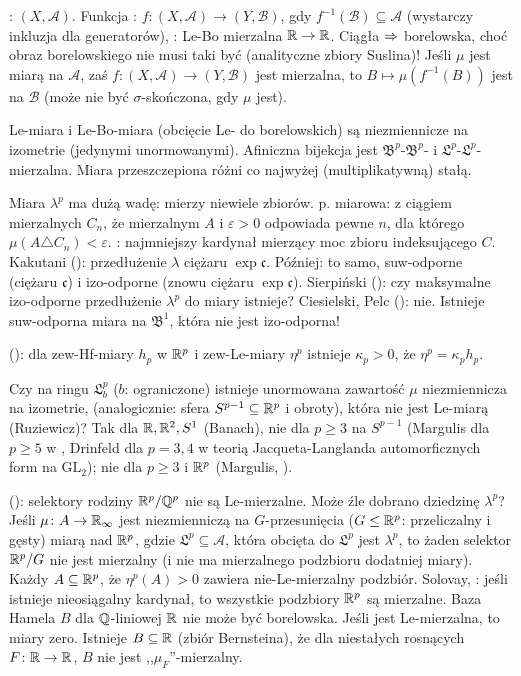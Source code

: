 :  $(X, \mathcal A)$.
Funkcja : $f \colon (X, \mathcal A) \to (Y, \mathcal B)$, gdy $f^{-1}(\mathcal B) \subseteq \mathcal A$ (wystarczy inkluzja dla generatorów), : Le-Bo mierzalna $\mathbb{R} \to \mathbb{R}$.
Ciągła $\Rightarrow$ borelowska, choć obraz borelowskiego nie musi taki być (analityczne zbiory Suslina)!
Jeśli $\mu$ jest miarą na $\mathcal A$, zaś $f \colon (X, \mathcal A) \to (Y, \mathcal B)$ jest mierzalna, to $B \mapsto \mu (f^{-1}(B))$ jest  na $\mathcal B$ (może nie być $\sigma$-skończona, gdy $\mu$ jest).

Le-miara  i Le-Bo-miara (obcięcie Le- do borelowskich) są niezmiennicze na izometrie (jedynymi unormowanymi).
Afiniczna bijekcja jest $\mathfrak B^p$-$\mathfrak B^p$- i $\mathfrak L^p$-$\mathfrak L^p$-mierzalna.
Miara przeszczepiona różni co najwyżej (multiplikatywną) stałą.

Miara $\lambda^p$ ma dużą wadę: mierzy niewiele zbiorów.
 p. miarowa: z ciągiem mierzalnych $C_n$, że mierzalnym $A$ i $\varepsilon > 0 $ odpowiada pewne $n$, dla którego $\mu(A \triangle C_n) < \varepsilon$.
: najmniejszy kardynał mierzący moc zbioru indeksującego $C$.
Kakutani (): przedłużenie $\lambda$ ciężaru $\exp \mathfrak c$.
Później: to samo, suw-odporne (ciężaru $\mathfrak c$) i izo-odporne (znowu ciężaru $\exp \mathfrak c$).
Sierpiński (): czy maksymalne izo-odporne przedłużenie $\lambda^p$ do miary istnieje?
Ciesielski, Pelc (): nie.
Istnieje suw-odporna miara na $\mathfrak B^1$, która nie jest izo-odporna!

 (): dla zew-Hf-miary $h_p$ w $\mathbb{R}^p$ i zew-Le-miary $\eta^p$ istnieje $\kappa_p > 0$, że $\eta^p = \kappa_p h_p$.

Czy na ringu $\mathfrak L^p_b$ ($b$: ograniczone) istnieje unormowana zawartość $\mu$ niezmiennicza na izometrie, (analogicznie: sfera $S^{p-1} \subseteq \mathbb{R}^p$ i obroty), która nie jest Le-miarą (Ruziewicz)?
Tak dla $\mathbb{R}, \mathbb{R}^2, S^1$ (Banach), nie dla $p \ge 3$ na $S^{p-1}$ (Margulis dla $p \ge 5$ w , Drinfeld dla $p = 3, 4$ w  teorią Jacqueta-Langlanda automorficznych form na $\textrm{GL}_2$); nie dla $p \ge 3$ i $\mathbb{R}^p$ (Margulis, ).

  (): selektory rodziny $\mathbb{R}^p/\mathbb{Q}^p$ nie są Le-mierzalne.
Może źle dobrano dziedzinę $\lambda^p$?
Jeśli $\mu \colon A \to \mathbb{R}_\infty$ jest niezmienniczą na $G$-przesunięcia ($G \le \mathbb{R}^p$: przeliczalny i gęsty) miarą nad $\mathbb{R}^p$, gdzie $\mathfrak L^p \subseteq \mathcal A$, która obcięta do $\mathfrak L^p$ jest $\lambda^p$, to żaden selektor $\mathbb{R}^p/G$ nie jest mierzalny (i nie ma mierzalnego podzbioru dodatniej miary).
Każdy $A \subseteq \mathbb{R}^p$, że $\eta^p(A) > 0$ zawiera nie-Le-mierzalny podzbiór.
Solovay, : jeśli istnieje nieosiągalny kardynał, to wszystkie podzbiory $\mathbb{R}^p$ są mierzalne.
Baza Hamela $B$ dla $\mathbb{Q}$-liniowej $\mathbb{R}$ nie może być borelowska.
Jeśli jest Le-mierzalna, to miary zero.
Istnieje $B \subseteq \mathbb{R}$ (zbiór Bernsteina), że dla niestałych rosnących $F \colon \mathbb{R} \to \mathbb{R}$, $B$ nie jest ,,$\mu_F$''-mierzalny.

